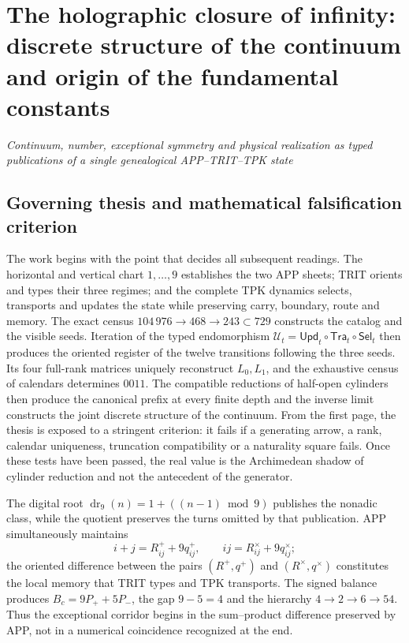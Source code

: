 \chapter*{The holographic closure of infinity: discrete structure of the continuum and origin of the fundamental constants}

\begin{center}
\large\itshape
Continuum, number, exceptional symmetry and physical realization as typed
publications of a single genealogical APP--TRIT--TPK state
\end{center}

\section*{Governing thesis and mathematical falsification criterion}

The work begins with the point that decides all subsequent readings. The
horizontal and vertical chart \(1,\ldots,9\) establishes the two APP sheets; TRIT
orients and types their three regimes; and the complete TPK dynamics selects,
transports and updates the state while preserving carry, boundary, route and memory.
The exact census \(104\,976\to468\to243\subset729\) constructs the catalog and the
visible seeds. Iteration of the typed endomorphism
\(\mathcal U_t=\mathsf{Upd}_t\circ\mathsf{Tra}_t\circ\mathsf{Sel}_t\) then produces
the oriented register of the twelve transitions following the three
seeds. Its four full-rank matrices uniquely reconstruct
\(L_0,L_1\), and the exhaustive census of calendars determines \(0011\). The
compatible reductions of half-open cylinders then produce the canonical prefix
at every finite depth and the inverse limit constructs the joint discrete
structure of the continuum. From the first page, the thesis is exposed
to a stringent criterion: it fails if a generating arrow, a rank,
calendar uniqueness, truncation compatibility or a naturality square
fails. Once these tests have been passed, the real value is the Archimedean shadow of
cylinder reduction and not the antecedent of the generator.

The digital root
\(\operatorname{dr}_9(n)=1+((n-1)\bmod9)\) publishes the nonadic class, while
the quotient preserves the turns omitted by that publication. APP simultaneously
maintains
\[
 i+j=R^+_{ij}+9q^+_{ij},\qquad
 ij=R^\times_{ij}+9q^\times_{ij};
\]
the oriented difference between the pairs \((R^+,q^+)\) and
\((R^\times,q^\times)\) constitutes the local memory that TRIT types and TPK
transports. The signed balance produces \(B_c=9P_++5P_-\), the gap
\(9-5=4\) and the hierarchy \(4\to2\to6\to54\). Thus the exceptional
corridor begins in the sum--product difference preserved by APP, not in
a numerical coincidence recognized at the end.

